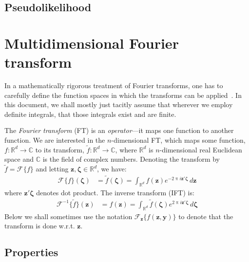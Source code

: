 \documentclass[a4paper,oneside,12pt,english]{report}
\def\zvec{\mathbf{z}}
\def\R{\mathbb{R}}
\def\yvec{\mathbf{y}}
\def\funcdef#1#2#3{#1:#2\to#3}
\def\Fset{\mathcal{F}}
\def\C{\mathbb{C}}
\newcommand\FT[2][]{\Fset_{#1}\{#2\}}
\def\IFT#1{\Fset^{-1}\{#1\}}
\begin{document}
\section{Pseudolikelihood}


\appendix

\chapter{Multidimensional Fourier transform}
\label{chap:MDFT}
\def\zetavec{\boldsymbol{\zeta}}
In a mathematically rigorous treatment of Fourier transforms, one has to carefully define the function spaces in which the transforms can be applied~\cite{SteinWeiss}. In this document, we shall mostly just tacitly assume that wherever we employ definite integrals, that those integrals exist and are finite.

The \emph{Fourier transform} (FT) is an \emph{operator}---it maps one function to another function. We are interested in the $n$-dimensional FT, which maps some function, $\funcdef{f}{\R^d}{\C}$ to its transform, $\funcdef{\tilde f}{\R^d}{\C}$, where $\R^d$ is $n$-dimensional real Euclidean space and $\C$ is the field of complex numbers. Denoting the transform by $\tilde f = \FT{f}$ and letting $\zvec,\zetavec\in\R^d$, we have:
\begin{align}
\label{eq:FT}
\FT{f}(\zetavec) &= \tilde f(\zetavec) = \int_{\R^d} f(\zvec)e^{-2\uppi i\zvec'\zetavec}\,d\zvec
\end{align}
where $\zvec'\zetavec$ denotes dot product. The inverse transform (IFT) is:
\begin{align}
\IFT{\tilde f}(\zvec) &= f(\zvec) = \int_{\R^d} \tilde f(\zetavec)e^{2\uppi i\zvec'\zetavec}\,d\zetavec
\end{align}
Below we shall sometimes use the notation $\FT[\zvec]{f(\zvec,\yvec)}$ to denote that the transform is done w.r.t. $\zvec$.

\section{Properties}
\end{document}
